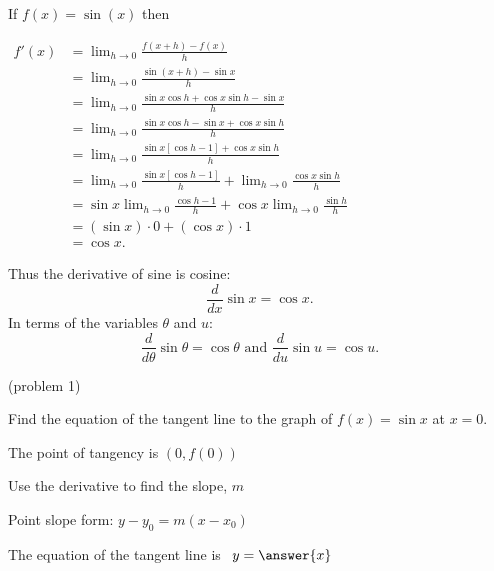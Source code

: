 \documentclass[handout]{ximera}
\begin{document}
\begin{explanation} %
If $f(x) = \sin(x)$ then
\begin{center}
$\begin{aligned}
f'(x) &= \lim_{h \to 0} \frac{f(x+h)-f(x)}{h} \\[5pt]
&= \lim_{h \to 0} \frac{\sin(x+h) - \sin x }{h}\\[5pt]
&=  \lim_{h \to 0} \frac{\sin x \cos h + \cos x \sin h  - \sin x }{h}\\[5pt]
&=  \lim_{h \to 0} \frac{\sin x \cos h  - \sin x  + \cos x \sin h }{h}\\[5pt]
&=  \lim_{h \to 0} \frac{\sin x [\cos h  -1] + \cos x \sin h }{h}\\[5pt]
&=  \lim_{h \to 0} \frac{\sin x [\cos h  -1]}{h} +\lim_{h \to 0} \frac{\cos x \sin h }{h}\\[5pt]
&=  \sin x\lim_{h \to 0} \frac{ \cos h  -1}{h} +\cos x\lim_{h \to 0} \frac{ \sin h }{h}\\[5pt]
&=  (\sin x) \cdot 0 + (\cos x)  \cdot 1 \\[5pt]
&= \cos x.
\end{aligned}$
\end{center}
Thus the derivative of sine is cosine:
\[
\frac{d}{dx}\sin x  = \cos x.
\]
In terms of the variables $\theta$ and $u$:
\[
\frac{d}{d\theta}\sin \theta  = \cos \theta  \text{  and  } \frac{d}{du}\sin u  = \cos u .
\]
\end{explanation}



\begin{problem}(problem 1)

Find the equation of the tangent line to the graph of $f(x) = \sin x$ at $x=0.$

\begin{hint}
The point of tangency is $(0, f(0))$
\end{hint}
\begin{hint}
Use the derivative to find the slope, $m$
\end{hint}
\begin{hint}
Point slope form: $y-y_0 = m(x-x_0)$
\end{hint}

The equation of the tangent line is \ $y = \answer{x}$

\end{problem}
\end{document}
